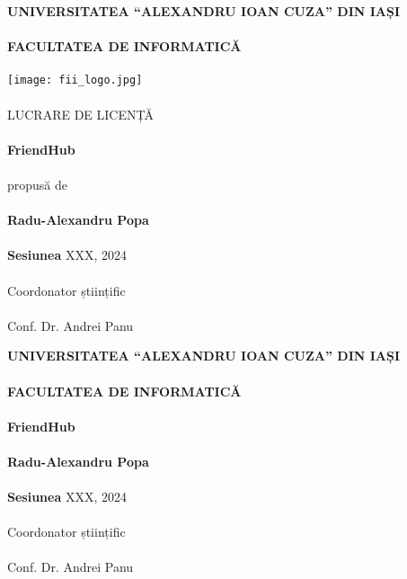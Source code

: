\documentclass{article}
\begin{document}
\begin{center}
    \textbf{UNIVERSITATEA “ALEXANDRU IOAN CUZA” DIN IAȘI\\
    \ \\
    FACULTATEA DE INFORMATICĂ}\\
    \ \\
    \texttt{[image: fii\_logo.jpg]}\\
    \ \\
    LUCRARE DE LICENȚĂ\\
    \ \\
    \textbf{FriendHub}\\
    \ \\
    propusă de\\
    \ \\
    \textbf{Radu-Alexandru Popa}\\
    \ \\
    \textbf{Sesiunea} XXX, 2024\\
    \ \\
    Coordonator științific\\
    \ \\
    Conf. Dr. Andrei Panu
\end{center}
\newpage
\begin{center}
    \textbf{UNIVERSITATEA “ALEXANDRU IOAN CUZA” DIN IAȘI\\
    \ \\
    FACULTATEA DE INFORMATICĂ}\\
    \ \\
    \textbf{FriendHub}\\
    \ \\
    \textbf{Radu-Alexandru Popa}\\
    \ \\
    \textbf{Sesiunea} XXX, 2024\\
    \ \\
    Coordonator științific\\
    \ \\
    Conf. Dr. Andrei Panu
\end{center}
\newpage
\end{document}
